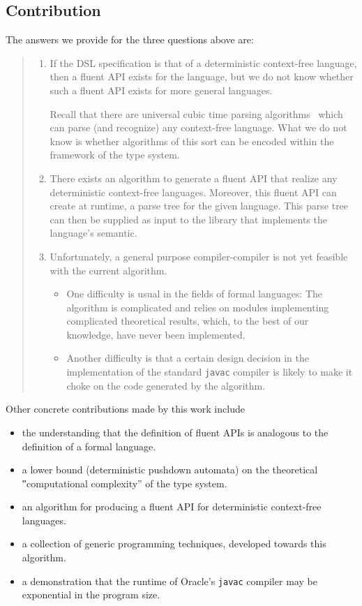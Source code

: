 \subsection{Contribution}
The answers we provide for the three questions above are:
\begin{quote}
  \begin{enumerate}
  \item If the DSL specification is that of a deterministic context-free
    language, then a fluent API exists for the language, but we do not know
    whether such a fluent API exists for more general languages.
  \par
  Recall that there are universal cubic time parsing
  algorithms~\cite{Cocke:1969,Earley:1970,Younger:1967} which can parse (and
  recognize) any context-free language. What we do not know is whether
  algorithms of this sort
  can be encoded within the framework of the \Java type system.
  \item
  There exists an algorithm to generate a fluent API that realize any
  deterministic context-free languages. Moreover, this fluent API can create
  at runtime, a parse tree for the given language. This parse tree can then be
  supplied as input to the library that implements the language's semantic.
  \item
  Unfortunately, a general purpose 
  compiler-compiler is not yet feasible with the current algorithm.
  \begin{itemize}
    \item One difficulty is usual in the fields of formal languages:
      The algorithm is complicated and relies on
      modules implementing complicated theoretical results, which, to the best
      of our knowledge, have never been implemented.
    \item Another difficulty is that a certain design decision in the
      implementation of the standard \texttt{javac} compiler is likely to make
      it choke on the \Java code generated by the algorithm.
  \end{itemize}
  \end{enumerate}
\end{quote}

Other concrete contributions made by this work include
\begin{itemize}
  \item the understanding that the definition of fluent APIs is analogous to
      the definition of a formal language.
  \item a lower bound (deterministic pushdown automata)
    on the theoretical ‟computational complexity” of the \Java type system.
  \item an algorithm for producing a fluent API for deterministic context-free
    languages.
  \item a collection of generic programming techniques, developed towards this
    algorithm.
  \item a demonstration that the runtime of Oracle's \texttt{javac} compiler
    may be exponential in the program size.
\end{itemize}

